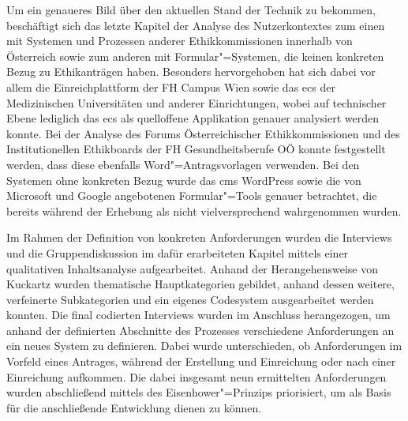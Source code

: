 \documentclass[a4paper,12pt,twoside]{scrreprt}
\begin{document}
\medskip

Um ein genaueres Bild über den aktuellen Stand der Technik zu bekommen, beschäftigt sich das letzte Kapitel der Analyse des Nutzerkontextes zum einen mit Systemen und Prozessen anderer Ethikkommissionen innerhalb von Österreich sowie zum anderen mit Formular"=Systemen, die keinen konkreten Bezug zu Ethikanträgen haben. Besonders hervorgehoben hat sich dabei vor allem die Einreichplattform der FH Campus Wien sowie das \acl{ecs} der Medizinischen Universitäten und anderer Einrichtungen, wobei auf technischer Ebene lediglich das \ac{ecs} als quelloffene Applikation genauer analysiert werden konnte. Bei der Analyse des Forums Österreichischer Ethikkommissionen und des Institutionellen Ethikboards der FH Gesundheitsberufe OÖ konnte festgestellt werden, dass diese ebenfalls Word"=Antragsvorlagen verwenden. Bei den Systemen ohne konkreten Bezug wurde das \acl{cms} WordPress sowie die von Microsoft und Google angebotenen Formular"=Tools genauer betrachtet, die bereits während der Erhebung als nicht vielversprechend wahrgenommen wurden.

\medskip

Im Rahmen der Definition von konkreten Anforderungen wurden die Interviews und die Gruppendiskussion im dafür erarbeiteten Kapitel mittels einer qualitativen Inhaltsanalyse aufgearbeitet. Anhand der Herangehensweise von Kuckartz wurden thematische Hauptkategorien gebildet, anhand dessen weitere, verfeinerte Subkategorien und ein eigenes Codesystem ausgearbeitet werden konnten. Die final codierten Interviews wurden im Anschluss herangezogen, um anhand der definierten Abschnitte des Prozesses verschiedene Anforderungen an ein neues System zu definieren. Dabei wurde unterschieden, ob Anforderungen im Vorfeld eines Antrages, während der Erstellung und Einreichung oder nach einer Einreichung aufkommen. Die dabei insgesamt neun ermittelten Anforderungen wurden abschließend mittels des Eisenhower"=Prinzips priorisiert, um als Basis für die anschließende Entwicklung dienen zu können.

\medskip
\end{document}
